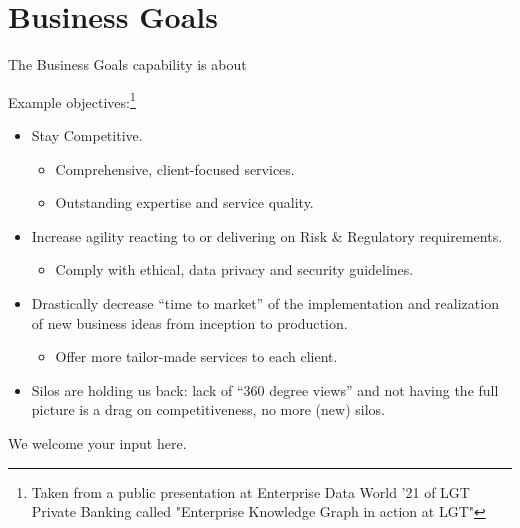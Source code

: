 \section{Business Goals}%
\label{sec:ekg-mm-a-1-2}
\label{sec:ekg-mm-business-goals}

The Business Goals capability is about


Example objectives:\footnote{Taken from a public presentation at Enterprise Data World '21 of LGT Private Banking
called "Enterprise Knowledge Graph in action at LGT"}

\begin{itemize}
    \item Stay Competitive.
          \begin{itemize}
              \item Comprehensive, client-focused services.
              \item Outstanding expertise and service quality.
          \end{itemize}
    \item Increase agility reacting to or delivering on Risk \& Regulatory requirements.
          \begin{itemize}
              \item Comply with ethical, data privacy and security guidelines.
          \end{itemize}
    \item Drastically decrease \enquote{time to market} of the implementation and realization of new business ideas from
          inception to production.
          \begin{itemize}
              \item Offer more tailor-made services to each client.
          \end{itemize}
    \item Silos are holding us back: lack of \enquote{360 degree views} and not having the full picture is a
          drag on competitiveness, no more (new) silos.
\end{itemize}

\ekgmmContextSection

We welcome your input here.
